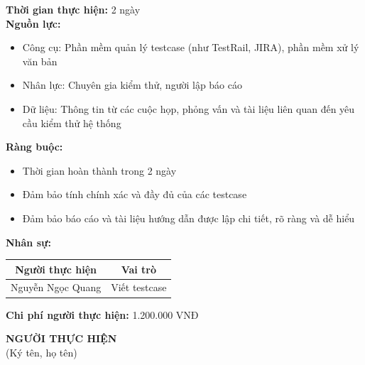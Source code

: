 {\begin{minipage}{\textwidth}
\begin{itemize}
    \end{itemize}
    \vspace{0.5cm}
    \noindent \textbf{Thời gian thực hiện:} 2 ngày \\
    \noindent \textbf{Nguồn lực:}
    \begin{itemize}
        \item Công cụ: Phần mềm quản lý testcase (như TestRail, JIRA), phần mềm xử lý văn bản
        \item Nhân lực: Chuyên gia kiểm thử, người lập báo cáo
        \item Dữ liệu: Thông tin từ các cuộc họp, phỏng vấn và tài liệu liên quan đến yêu cầu kiểm thử hệ thống
    \end{itemize}
    \vspace{0.5cm}
    \noindent \textbf{Ràng buộc:}
    \begin{itemize}
        \item Thời gian hoàn thành trong 2 ngày
        \item Đảm bảo tính chính xác và đầy đủ của các testcase
        \item Đảm bảo báo cáo và tài liệu hướng dẫn được lập chi tiết, rõ ràng và dễ hiểu
    \end{itemize}
    \vspace{0.5cm}
    \noindent \textbf{Nhân sự:}
    \begin{longtable}{|c|c|}
    \hline
    \textbf{Người thực hiện} & \textbf{Vai trò} \\
    \hline
    Nguyễn Ngọc Quang & Viết testcase \\
    \hline
    \end{longtable}
    \vspace{0.5cm}
    \noindent \textbf{Chi phí người thực hiện:} 1.200.000 VNĐ \\
    \vspace{1cm}
    \begin{flushleft}
        \hspace{8cm} \textbf{NGƯỜI THỰC HIỆN} \\
        \hspace{8.8cm} (Ký tên, họ tên) \\
        \vspace{1cm}
    \end{flushleft}
    \end{minipage}
}
% 
